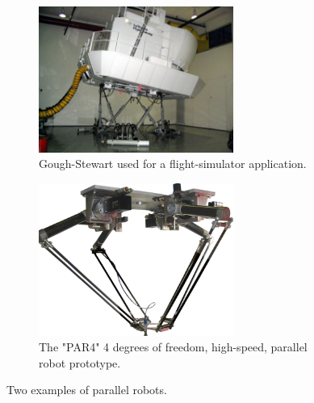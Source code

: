 \documentclass{thesisreport}
\begin{document}
\begin{figure}[h]
     \centering
     \begin{subfigure}[h]{0.45\textwidth}
         \centering
         \includegraphics[width=0.7\textwidth]{Images/Introduction/GS}
    \caption[Caption for LOF]{Gough-Stewart used for a flight-simulator application.\protect\footnotemark}
         \label{GS}
     \end{subfigure}
     \hfill
     \begin{subfigure}[h]{0.45\textwidth}
         \centering
         \includegraphics[width=0.7\textwidth]{Images/Introduction/PAR4}
         \caption[Caption for LOF]{The "PAR4" 4 degrees of freedom, high-speed, parallel robot prototype.\protect\footnotemark}
         \label{PAR4}
     \end{subfigure}
        \caption{Two examples of parallel robots.}
        \label{fig:three graphs}
\end{figure}




\end{document}
